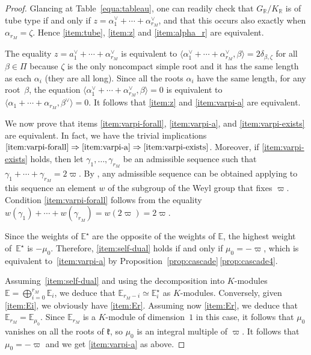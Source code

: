 \documentclass[10pt]{amsart}
\let\oldvee\vee
\renewcommand{\vee}{{\scriptscriptstyle\oldvee}}
\newcommand{\citestar}[3]{\cite[#3]{#1}}
\theoremstyle{plain}
\theoremstyle{definition}
\newcommand{\bE}{\mathbb{E}}
\newcommand{\bR}{\mathbb{R}}
\newcommand{\fk}{\mathfrak{k}}
\newcommand{\suma}[1]{\alpha_1^\vee + \cdots + \alpha_{#1}^\vee}
\newcommand{\rkm}{{r_M}}
\newcommand{\scal}[1]{\langle #1 \rangle}
\begin{document}
\begin{proof}
Glancing at Table~\ref{equa:tableau}, one can readily
check that $G_\bR / K_\bR$ is of tube type if and only if $z=\alpha_1^\vee + \cdots + \alpha_\rkm^\vee$,
and that this occurs also exactly when $\alpha_\rkm=\zeta$. Hence \eqref{item:tube}, \eqref{item:z} and
\eqref{item:alpha_r} are equivalent.

The equality $z=a_1^\vee+\cdots+\alpha_\rkm^\vee$ is equivalent to $\scal{\suma{\rkm},\beta} = 2
\delta_{\beta,\zeta}$ for all
$\beta\in\Pi$ because $\zeta$ is the only noncompact simple root and it has the same length as each
$\alpha_i$ (they are all long).
Since all the roots $\alpha_i$ have the same length, for any root~$\beta$,
the equation $\scal{\suma{\rkm},\beta}=0$ is equivalent to
$\scal{\alpha_1 + \cdots + \alpha_\rkm,\beta^\vee}=0$. It follows that \eqref{item:z} and \eqref{item:varpi-a}
are equivalent.

We now prove that items \eqref{item:varpi-forall}, \eqref{item:varpi-a}, and
\eqref{item:varpi-exists} are equivalent. In fact, we have the trivial implications
$\eqref{item:varpi-forall} \Rightarrow \eqref{item:varpi-a} \Rightarrow \eqref{item:varpi-exists}$. Moreover, if
\eqref{item:varpi-exists} holds, then let $\gamma_1,\ldots,\gamma_\rkm$ be an admissible sequence
such that $\gamma_1+\cdots+\gamma_\rkm = 2\varpi$. By \citestar{richardson}*{Th.\,2.1}, any admissible
sequence can be obtained applying to this sequence an element $w$ of the subgroup of the Weyl group
that fixes $\varpi$.
Condition \eqref{item:varpi-forall} follows from the equality $w(\gamma_1)+\cdots+w(\gamma_\rkm)=w(2\varpi)=2\varpi$.

Since the weights of $\bE^\star$ are the opposite of the weights of $\bE$, the highest
weight of~$\bE^\star$ is $-\mu_0$. Therefore, \eqref{item:self-dual} holds if and only if
$\mu_0=-\varpi$, which is equivalent to~\eqref{item:varpi-a} by Proposition~\ref{prop:cascade}\,\eqref{prop:cascade4}.

Assuming~\eqref{item:self-dual} and using the decomposition into $K$-modules $\bE =
\bigoplus_{i=0}^{\rkm} \bE_i$, we deduce that
$\bE_{\rkm-i} \simeq \bE_{i}^\star$ as $K$-modules. Conversely, given \eqref{item:Ei}, we obviously
have \eqref{item:Er}.
Assuming now \eqref{item:Er}, we deduce that $\bE_\rkm=\bE_{\mu_0}$. Since $\bE_{\rkm}$ is a
$K$-module of dimension~$1$ in this
case, it follows that $\mu_0$ vanishes on all the roots of $\fk$, so $\mu_0$ is an integral
multiple of $\varpi$. It follows
that $\mu_0=-\varpi$ and we get \eqref{item:varpi-a} as above.
\end{proof}
\end{document}
